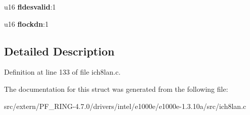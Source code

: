 \begin{DoxyCompactItemize}
\item 
\hypertarget{structich8__hws__flash__status_1_1ich8__hsfsts_a3f71ce69ef2619cd6dcd597b9ef776e5}{
u16 {\bfseries fldesvalid}:1}
\label{structich8__hws__flash__status_1_1ich8__hsfsts_a3f71ce69ef2619cd6dcd597b9ef776e5}

\item 
\hypertarget{structich8__hws__flash__status_1_1ich8__hsfsts_a0065d7233b99e38e40ab01feb2ba5753}{
u16 {\bfseries flockdn}:1}
\label{structich8__hws__flash__status_1_1ich8__hsfsts_a0065d7233b99e38e40ab01feb2ba5753}

\end{DoxyCompactItemize}


\subsection{Detailed Description}


Definition at line 133 of file ich8lan.c.



The documentation for this struct was generated from the following file:\begin{DoxyCompactItemize}
\item 
src/extern/PF\_\-RING-\/4.7.0/drivers/intel/e1000e/e1000e-\/1.3.10a/src/ich8lan.c\end{DoxyCompactItemize}
